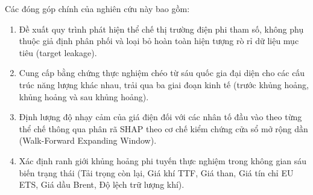 Các đóng góp chính của nghiên cứu này bao gồm:
\begin{enumerate}[label=(\roman*)]
  \item Đề xuất quy trình phát hiện thể chế thị trường điện phi tham số, không phụ thuộc giả định phân phối và loại bỏ hoàn toàn hiện tượng rò rỉ dữ liệu mục tiêu (target leakage).
  \item Cung cấp bằng chứng thực nghiệm chéo từ sáu quốc gia đại diện cho các cấu trúc năng lượng khác nhau, trải qua ba giai đoạn kinh tế (trước khủng hoảng, khủng hoảng và sau khủng hoảng).
  \item Định lượng độ nhạy cảm của giá điện đối với các nhân tố đầu vào theo từng thể chế thông qua phân rã SHAP theo cơ chế kiểm chứng cửa sổ mở rộng dần (Walk-Forward Expanding Window).
  \item Xác định ranh giới khủng hoảng phi tuyến thực nghiệm trong không gian sáu biến trạng thái (Tải trọng còn lại, Giá khí TTF, Giá than, Giá tín chỉ EU ETS, Giá dầu Brent, Độ lệch trữ lượng khí).
\end{enumerate}
